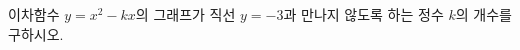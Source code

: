 \hspace*{2mm}\begin{minipage}[t]{\dimexpr\linewidth-2mm\relax}\vspace{0pt}
이차함수 $y=x^2-kx$의 그래프가 직선 $y=-3$과 만나지 않도록 하는 정수 $k$의 개수를 구하시오.\end{minipage}
